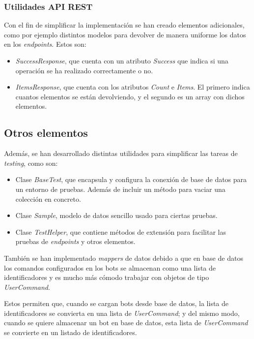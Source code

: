 \subsubsection{Utilidades API REST}

Con el fin de simplificar la implementación se han creado elementos adicionales, como por ejemplo distintos modelos para devolver de manera uniforme los datos en los \textit{endpoints}. Estos son:

\begin{itemize}
	\item \textit{SuccessResponse}, que cuenta con un atributo \textit{Success} que indica si una operación se ha realizado correctamente o no.
	\item \textit{ItemsResponse}, que cuenta con los atributos \textit{Count} e \textit{Items}. El primero indica cuantos elementos se están devolviendo, y el segundo es un array con dichos elementos.
\end{itemize}


\subsection{Otros elementos}

Además, se han desarrollado distintas utilidades para simplificar las tareas de \textit{testing}, como son:

\begin{itemize}
	\item Clase \textit{BaseTest}, que encapsula y configura la conexión de base de datos para un entorno de pruebas. Además de incluir un método para vaciar una colección en concreto.
	\item Clase \textit{Sample}, modelo de datos sencillo usado para ciertas pruebas.
	\item Clase \textit{TestHelper}, que contiene métodos de extensión para facilitar las pruebas de \textit{endpoints} y otros elementos.
\end{itemize}

También se han implementado \textit{mappers} de datos debido a que en base de datos los comandos configurados en los bots se almacenan como una lista de identificadores y es mucho más cómodo trabajar con objetos de tipo \textit{UserCommand}.

Estos permiten que, cuando se cargan bots desde base de datos, la lista de identificadores se convierta en una lista de \textit{UserCommand}; y del mismo modo, cuando se quiere almacenar un bot en base de datos, esta lista de \textit{UserCommand} se convierte en un listado de identificadores.




